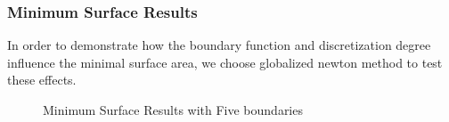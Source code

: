 \subsubsection{Minimum Surface Results}
In order to demonstrate how the boundary function and discretization degree influence the minimal surface area, we choose globalized newton method to test these effects.
\begin{figure}[!htbp]
    \centering
    \caption{Minimum Surface Results with Five boundaries}
    \label{fig:min_surf_boundaries}  
\end{figure}

